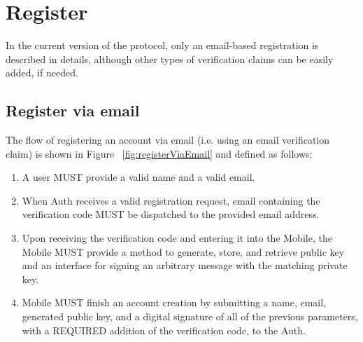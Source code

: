 \section{Register}
 In the current version of the protocol, only an email-based registration is described in details, although 	
other types of verification claims can be easily added, if needed.

    \subsection{Register via email}
    The flow of registering an account via email (i.e. using an email verification claim) is shown in 
    Figure ~\ref{fig:registerViaEmail} and defined as follows:
    \begin{enumerate}
        \item A user MUST provide a valid name and a valid email.
        \item When Auth receives a valid registration request, email containing the verification code MUST 
              be dispatched to the provided email address.
        \item Upon receiving the verification code and entering it into the Mobile, the Mobile MUST provide 
              a method to generate, store, and retrieve public key and an interface for signing an arbitrary 
              message with the matching private key.
        \item Mobile MUST finish an account creation by submitting a name, email, generated public key, and 
              a digital signature of all of the previous parameters, with a REQUIRED addition of the 
              verification code, to the Auth.
    \end{enumerate}  
    

